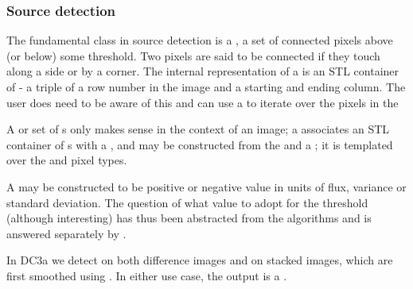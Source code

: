 \subsubsection{Source detection}

The fundamental class in source detection is a , a set of 
connected pixels above (or below) some threshold. Two pixels are said to be 
connected if they touch along a side or by a corner. The internal 
representation of a  is an STL container of  - 
a triple of a row number in the image and a starting and ending column. The 
user does need to be aware of this and can use a  to
iterate over the pixels in the 

A  or set of s only makes sense in the 
context of an image; a  associates an STL container of 
s with a , and may be constructed from 
the  and a ; it is templated over the 
 and  pixel types.

A  may be constructed to be positive or negative value in 
units of flux, variance or standard deviation. The question of what value to 
adopt for the threshold (although interesting) has thus been abstracted from 
the algorithms and is answered separately by . 

In DC3a we detect on both difference images and on stacked images, which are 
first smoothed using . In either use case, the output
is a .

